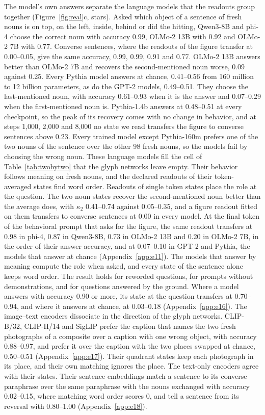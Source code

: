 \documentclass[10pt]{article}
\theoremstyle{plain}
\theoremstyle{remark}
\begin{document}
The model's own answers separate the language models that the readouts group together (Figure~\ref{fig:real}c, stars). Asked which object of a sentence of fresh nouns is on top, on the left, inside, behind or did the hitting, Qwen3-8B and phi-4 choose the correct noun with accuracy 0.99, OLMo-2 13B with 0.92 and OLMo-2 7B with 0.77. Converse sentences, where the readouts of the figure transfer at 0.00--0.05, give the same accuracy, 0.99, 0.99, 0.91 and 0.77. OLMo-2 13B answers better than OLMo-2 7B and recovers the second-mentioned noun worse, 0.09 against 0.25. Every Pythia model answers at chance, 0.41--0.56 from 160 million to 12 billion parameters, as do the GPT-2 models, 0.49--0.51. They choose the last-mentioned noun, with accuracy 0.61--0.93 when it is the answer and 0.07--0.29 when the first-mentioned noun is. Pythia-1.4b answers at 0.48--0.51 at every checkpoint, so the peak of its recovery comes with no change in behavior, and at steps 1{,}000, 2{,}000 and 8{,}000 no state we read transfers the figure to converse sentences above 0.23. Every trained model except Pythia-160m prefers one of the two nouns of the sentence over the other 98 fresh nouns, so the models fail by choosing the wrong noun. These language models fill the cell of Table~\ref{tab:twobytwo} that the glyph networks leave empty. Their behavior follows meaning on fresh nouns, and the declared readouts of their token-averaged states find word order. Readouts of single token states place the role at the question. The two noun states recover the second-mentioned noun better than the average does, with $\kappa_2$ 0.41--0.74 against 0.05--0.35, and a figure readout fitted on them transfers to converse sentences at 0.00 in every model. At the final token of the behavioral prompt that asks for the figure, the same readout transfers at 0.98 in phi-4, 0.87 in Qwen3-8B, 0.73 in OLMo-2 13B and 0.20 in OLMo-2 7B, in the order of their answer accuracy, and at 0.07--0.10 in GPT-2 and Pythia, the models that answer at chance (Appendix~\ref{app:e11}). The models that answer by meaning compute the role when asked, and every state of the sentence alone keeps word order. The result holds for reworded questions, for prompts without demonstrations, and for questions answered by the ground. Where a model answers with accuracy 0.90 or more, its state at the question transfers at 0.70--0.94, and where it answers at chance, at 0.03--0.18 (Appendix~\ref{app:e16}). The image--text encoders dissociate in the direction of the glyph networks. CLIP-B/32, CLIP-H/14 and SigLIP prefer the caption that names the two fresh photographs of a composite over a caption with one wrong object, with accuracy 0.88--0.97, and prefer it over the caption with the two places swapped at chance, 0.50--0.51 (Appendix~\ref{app:e17}). Their quadrant states keep each photograph in its place, and their own matching ignores the place. The text-only encoders agree with their states. Their sentence embeddings match a sentence to its converse paraphrase over the same paraphrase with the nouns exchanged with accuracy 0.02--0.15, where matching word order scores 0, and tell a sentence from its reversal with 0.80--1.00 (Appendix~\ref{app:e18}).
\end{document}
